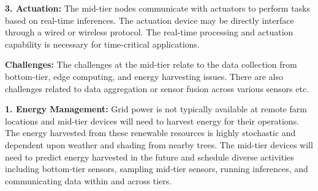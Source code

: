 \noindent\textbf{3. Actuation:} The mid-tier nodes communicate with actuators to perform tasks based on real-time inferences. The actuation device may be directly interface through a wired or wireless protocol. The real-time processing and actuation capability is necessary for time-critical applications. 

\noindent\textbf{Challenges:} The challenges at the mid-tier relate to the data collection from bottom-tier, edge computing, and energy harvesting issues. There are also challenges related to data aggregation or sensor fusion across various sensors etc. 

\noindent\textbf{1. Energy Management:} Grid power is not typically available at remote farm locations and mid-tier devices will need to harvest energy for their operations. The energy harvested from these renewable resources is highly stochastic and dependent upon weather and shading from nearby trees. The mid-tier devices will need to predict energy harvested in the future and schedule diverse activities including bottom-tier sensors, sampling mid-tier sensors, running inferences, and communicating data within and across tiers.  

